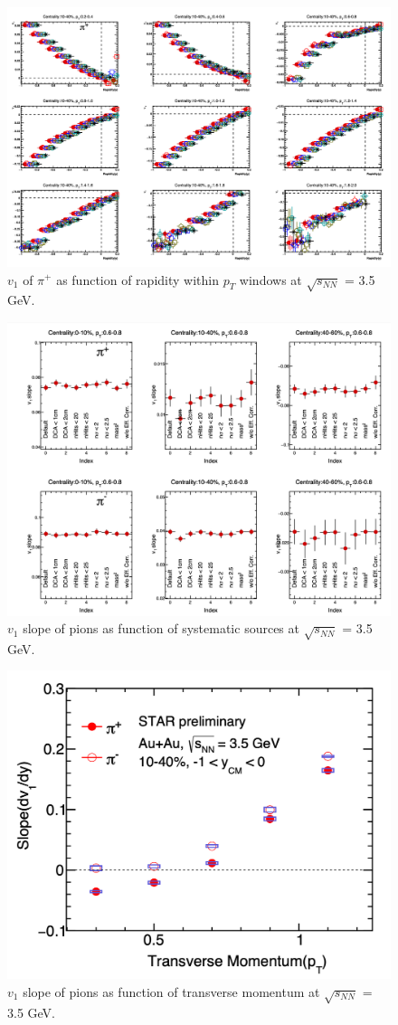 \begin{figure}[hbt!]
\centering
\includegraphics[width=0.95\linewidth]{figures/chapter03/3p5gev_pionplus_v1yPt_sysUnc.png}
\caption{$v_1$ of $\pi^+$ as function of rapidity within $p_T$ windows at $\sqrt{s_{NN}}$ = 3.5 GeV.}
\label{fig:3p5gev_pionplus_v1yPt_sysUnc}
\end{figure}

\begin{figure}[hbt!]
\centering
\includegraphics[width=0.85\linewidth]{figures/chapter03/3p5gev_pion_v1slopeIndex_sysUnc.png}
\caption{$v_1$ slope of pions as function of systematic sources at $\sqrt{s_{NN}}$ = 3.5 GeV.}
\label{fig:3p5gev_pion_v1slopeIndex_sysUnc}
\end{figure}

\begin{figure}[hbt!]
\centering
\includegraphics[width=0.55\linewidth]{figures/chapter03/3p5gev_pion_v1slopePt.png}
\caption{$v_1$ slope of pions as function of transverse momentum at $\sqrt{s_{NN}}$ = 3.5 GeV.}
\label{fig:3p5gev_pion_v1slopePt}
\end{figure}

